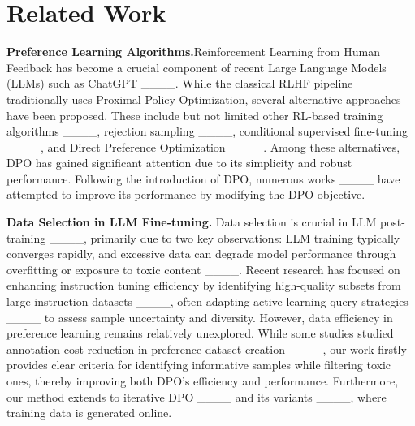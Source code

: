 \section{Related Work}
\label{sec:rel}

\textbf{Preference Learning Algorithms.}Reinforcement Learning from Human Feedback %
has become a crucial component of recent Large Language Models (LLMs) such as ChatGPT ____. While the classical RLHF pipeline traditionally uses Proximal Policy Optimization, several alternative approaches have been proposed. These include but not limited other RL-based training algorithms ____, rejection sampling ____, conditional supervised fine-tuning ____, and Direct Preference Optimization ____. Among these alternatives, DPO has gained significant attention due to its simplicity and robust performance. Following the introduction of DPO, numerous works ____ have attempted to improve its performance by modifying the DPO objective.

\textbf{Data Selection in LLM Fine-tuning.} Data selection is crucial in LLM post-training ____, primarily due to two key observations: LLM training typically converges rapidly, and excessive data can degrade model performance through overfitting or exposure to toxic content ____. Recent research has focused on enhancing instruction tuning efficiency by identifying high-quality subsets from large instruction datasets ____, often adapting active learning query strategies ____ to assess sample uncertainty and diversity. However, data efficiency in preference learning remains relatively unexplored. While some studies studied annotation cost reduction in preference dataset creation ____, our work firstly provides clear criteria for identifying informative samples while filtering toxic ones, thereby improving both DPO's efficiency and performance. Furthermore, our method extends to iterative DPO ____ and its variants ____, where training data is generated online.